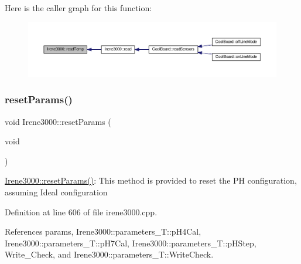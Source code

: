 Here is the caller graph for this function\+:\nopagebreak
\begin{figure}[H]
\begin{center}
\leavevmode
\includegraphics[width=350pt]{classIrene3000_a94ad40f281d83ad1be20bf1edd6fe802_icgraph}
\end{center}
\end{figure}
\mbox{\label{classIrene3000_a0fba280e8b7c881307efa31281aa691d}} 
\subsubsection{\texorpdfstring{reset\+Params()}{resetParams()}}
{\footnotesize\ttfamily void Irene3000\+::reset\+Params (\begin{DoxyParamCaption}\item[{void}]{ }\end{DoxyParamCaption})}

\hyperlink{classIrene3000_a0fba280e8b7c881307efa31281aa691d}{Irene3000\+::reset\+Params()}\+: This method is provided to reset the PH configuration, assuming Ideal configuration 

Definition at line 606 of file irene3000.\+cpp.



References params, Irene3000\+::parameters\+\_\+\+T\+::p\+H4\+Cal, Irene3000\+::parameters\+\_\+\+T\+::p\+H7\+Cal, Irene3000\+::parameters\+\_\+\+T\+::p\+H\+Step, Write\+\_\+\+Check, and Irene3000\+::parameters\+\_\+\+T\+::\+Write\+Check.



